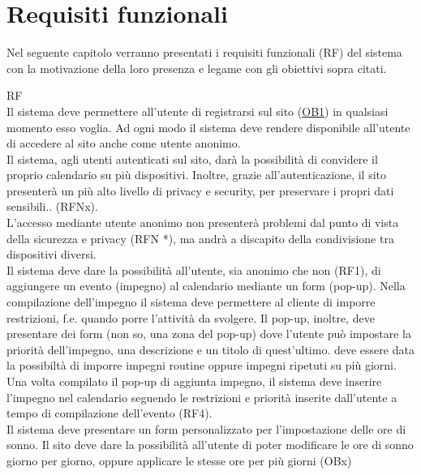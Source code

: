 \section{Requisiti funzionali}
\label{sec:RequisitiFunzionali}

Nel seguente capitolo verranno presentati i requisiti funzionali (RF)
del sistema con la motivazione della loro presenza e legame
con gli obiettivi sopra citati.
\begin {listaPersonale}{RF}
 \\ %
Il sistema deve permettere all'utente di registrarsi sul sito (\hyperlink{ob.one}{OB1}) in qualsiasi momento esso voglia. Ad ogni modo il sistema deve rendere disponibile all'utente di accedere al sito anche come utente anonimo.
\\
Il sistema, agli utenti autenticati sul sito, darà la possibilità di convidere il proprio calendario su più dispositivi. Inoltre, grazie all'autenticazione, il sito presenterà un più alto livello di privacy e security, per preservare i propri dati sensibili..
(RFNx).
 \\
L'accesso mediante utente anonimo non presenterà problemi dal punto di vista della sicurezza e privacy (RFN *), ma andrà a discapito della condivisione tra dispositivi diversi.
 \\
Il sistema deve dare la possibilità all'utente, sia anonimo che non (RF1), di aggiungere un evento (impegno) al calendario mediante un form (pop-up). Nella compilazione dell'impegno il sistema deve permettere al cliente di imporre restrizioni, f.e. quando porre l'attività da svolgere. Il pop-up, inoltre, deve presentare dei form (non so, una zona del pop-up) dove l'utente può impostare la priorità dell'impegno, una descrizione e un titolo di quest'ultimo. deve essere data la possibiltà di imporre impegni routine oppure impegni ripetuti su più giorni.
 \\
Una volta compilato il pop-up di aggiunta impegno, il sistema deve inserire l'impegno nel calendario seguendo le restrizioni e priorità inserite dall'utente a tempo di compilazione dell'evento (RF4).
 \\
Il sistema deve presentare un form personalizzato per l'impostazione delle ore di sonno. Il sito deve dare la possibilità all'utente di poter modificare le ore di sonno giorno per giorno, oppure applicare le stesse ore per più giorni (OBx)
 \\

\end{listaPersonale}
